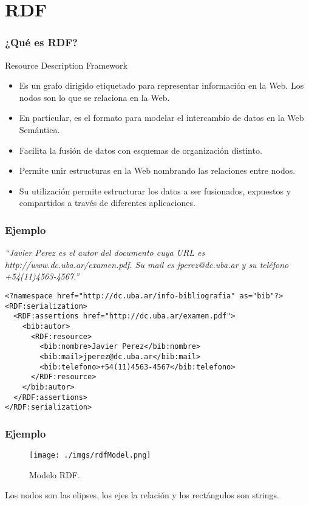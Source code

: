 \documentclass{beamer}
\begin{document}
\section{RDF}
\begin{frame}[fragile] %
\frametitle{¿Qué es RDF?}
\begin{block}{Resource Description Framework}
\begin{itemize}
\item<1-> Es un grafo dirigido etiquetado para representar información en la Web. Los nodos son lo que se relaciona en la Web.
\item<2-> En particular, es el formato para modelar el intercambio de datos en la Web Semántica. 
\item<3-> Facilita la fusión de datos con esquemas de organización distinto.
\item<4-> Permite unir estructuras en la Web nombrando las relaciones entre nodos.
\item<5-> Su utilización permite estructurar los datos a ser fusionados, expuestos y compartidos a través de diferentes aplicaciones.
\end{itemize}
\end{block}
\end{frame}

\begin{frame}[fragile]
\frametitle{Ejemplo}
\textit{``Javier Perez es el autor del documento cuya URL es http://www.dc.uba.ar/examen.pdf. Su mail es jperez@dc.uba.ar y su teléfono +54(11)4563-4567.''}
\begin{verbatim}
<?namespace href="http://dc.uba.ar/info-bibliografia" as="bib"?> 
<RDF:serialization> 
  <RDF:assertions href="http://dc.uba.ar/examen.pdf"> 
    <bib:autor> 
      <RDF:resource> 
        <bib:nombre>Javier Perez</bib:nombre> 
        <bib:mail>jperez@dc.uba.ar</bib:mail> 
        <bib:telefono>+54(11)4563-4567</bib:telefono> 
      </RDF:resource> 
    </bib:autor> 
  </RDF:assertions> 
</RDF:serialization>

\end{verbatim}
\end{frame}

\begin{frame}[fragile]
\frametitle{Ejemplo} 
\begin{center}
\begin{figure}[H] %
\texttt{[image: ./imgs/rdfModel.png]}
\caption{Modelo RDF.}
\end{figure}
Los nodos son las elipses, los ejes la relación y los rectángulos son strings.
\end{center}
\end{frame}
\end{document}

